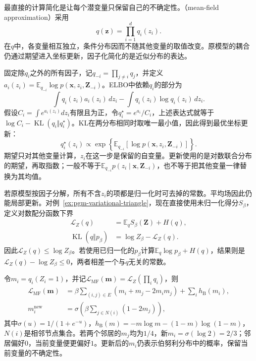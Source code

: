 最直接的计算简化是让每个潜变量只保留自己的不确定性。（mean-field approximation）采用
\[
  q(\bm{z})=\prod_{i=1}^{d}q_i(z_i).
\]
在$q$中，各变量相互独立，条件分布因而不随其他变量的取值改变。原模型的耦合仍通过期望进入坐标更新，因子化简化的是近似分布的表达。

固定除$q_i$之外的所有因子，记$q_{-i}=\prod_{j\ne i}q_j$，并定义$a_i(z_i)=\mathbb E_{q_{-i}}\log p(\bm{x},z_i,\bm{Z}_{-i})$。ELBO中依赖$q_i$的部分为
\[
  \int q_i(z_i)a_i(z_i)\,dz_i-\int q_i(z_i)\log q_i(z_i)\,dz_i.
\]
假设$C_i=\int e^{a_i(z_i)}dz_i$有限且为正，令$q_i^\star=e^{a_i}/C_i$，上述表达式就等于$\log C_i-\operatorname{KL}(q_i\Vert q_i^\star)$。KL在两分布相同时取唯一最小值，因此得到最优坐标更新：
\begin{equation}
  q_i^\star(z_i)
    \propto\exp\left\{\mathbb E_{q_{-i}}
      [\log p(\bm{x},z_i,\bm{Z}_{-i})]\right\}.
  \label{eq:pgm-variational-coordinate}
\end{equation}
期望只对其他变量计算，$z_i$在这一步是保留的自变量。更新使用的是对数联合分布的期望，再取指数；一般不等于$\mathbb E_{q_{-i}}p(z_i\mid\bm{x},\bm{Z}_{-i})$，也不等于把其他变量一律替换为其均值。

若原模型按因子分解，所有不含$z_i$的项都是归一化时可去掉的常数。平均场因此仍能局部更新。对例~\ref{ex:pgm-variational-triangle}，现在直接使用未归一化得分$S_\beta$，定义对数配分函数下界
\begin{equation}
  \begin{aligned}
    \mathcal L_Z(q)&=\mathbb E_qS_\beta(\bm Z)+H(q),\\
    \operatorname{KL}(q\Vert p_\beta)
      &=\log Z_\beta-\mathcal L_Z(q).
  \end{aligned}
  \label{eq:pgm-variational-partition-lower-bound}
\end{equation}
因此$\mathcal L_Z(q)\leq\log Z_\beta$。若使用已归一化的$p_\beta$计算$\mathbb E_q\log p_\beta+H(q)$，结果则是$\mathcal L_Z(q)-\log Z_\beta\leq0$，两者相差一个与$q$无关的常数。

令$m_i=q_i(Z_i=1)$，并记$\mathcal L_{\mathrm{MF}}(\bm m)=\mathcal L_Z(\prod_iq_i)$，则
\begin{equation}
  \begin{aligned}
    \mathcal L_{\mathrm{MF}}(\bm m)
      &=\beta\sum_{(i,j)\in E}
           (m_i+m_j-2m_im_j)+\sum_i h_{\mathrm B}(m_i),\\
    m_i^{\mathrm{new}}
      &=\sigma\left(\beta\sum_{j\in N(i)}(1-2m_j)\right),
  \end{aligned}
  \label{eq:pgm-variational-triangle-mf}
\end{equation}
其中$\sigma(u)=1/(1+e^{-u})$，$h_{\mathrm B}(m)=-m\log m-(1-m)\log(1-m)$，$N(i)$是相邻节点集合。若两个邻居的$m_j$均为$1/4$，新$m_i=\sigma(\log2)=2/3$；邻居偏好$0$，当前变量便更偏好$1$。更新后的$m_i$仍表示伯努利分布中的概率，保留当前变量的不确定性。

